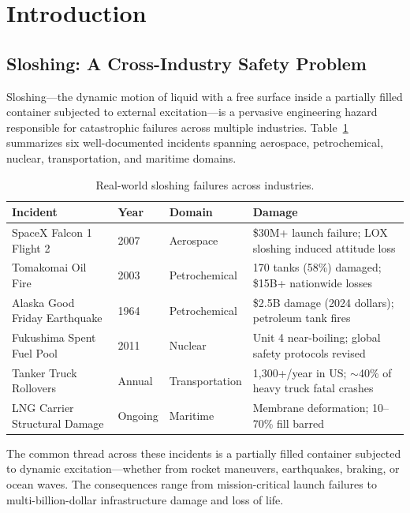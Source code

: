 \documentclass[11pt]{article}
\begin{document}
\section{Introduction}

\subsection{Sloshing: A Cross-Industry Safety Problem}

Sloshing---the dynamic motion of liquid with a free surface inside a partially filled container subjected to external excitation---is a pervasive engineering hazard responsible for catastrophic failures across multiple industries. Table~\ref{tab:accidents} summarizes six well-documented incidents spanning aerospace, petrochemical, nuclear, transportation, and maritime domains.

\begin{table}[htbp]
\centering
\caption{Real-world sloshing failures across industries.}
\label{tab:accidents}
\small
\begin{tabular}{@{}llll@{}}
\toprule
\textbf{Incident} & \textbf{Year} & \textbf{Domain} & \textbf{Damage} \\
\midrule
SpaceX Falcon 1 Flight 2 & 2007 & Aerospace & \$30M+ launch failure; LOX sloshing induced attitude loss \citep{spacex2007} \\
Tomakomai Oil Fire & 2003 & Petrochemical & 170 tanks (58\%) damaged; \$15B+ nationwide losses \citep{hatayama2004} \\
Alaska Good Friday Earthquake & 1964 & Petrochemical & \$2.5B damage (2024 dollars); petroleum tank fires \citep{usgs1964} \\
Fukushima Spent Fuel Pool & 2011 & Nuclear & Unit 4 near-boiling; global safety protocols revised \citep{nrc2011} \\
Tanker Truck Rollovers & Annual & Transportation & 1,300+/year in US; {$\sim$}40\% of heavy truck fatal crashes \citep{fmcsa2023} \\
LNG Carrier Structural Damage & Ongoing & Maritime & Membrane deformation; 10--70\% fill barred \citep{lloyd2024} \\
\bottomrule
\end{tabular}
\end{table}

The common thread across these incidents is a partially filled container subjected to dynamic excitation---whether from rocket maneuvers, earthquakes, braking, or ocean waves. The consequences range from mission-critical launch failures to multi-billion-dollar infrastructure damage and loss of life.
\end{document}
